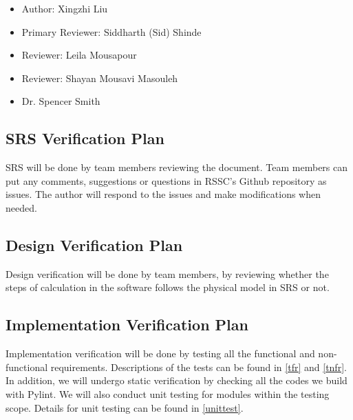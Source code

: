 \documentclass[12pt, titlepage]{article}
\begin{document}
\begin{itemize}
	\item Author: Xingzhi Liu
\end{itemize}

\begin{itemize}
	\item Primary Reviewer: Siddharth (Sid) Shinde
\end{itemize}

\begin{itemize}
	\item Reviewer: Leila Mousapour
\end{itemize}

\begin{itemize}
	\item Reviewer: Shayan Mousavi Masouleh
\end{itemize}

\begin{itemize}
	\item Dr. Spencer Smith
\end{itemize}

\subsection{SRS Verification Plan}

SRS will be done by team members reviewing the document. Team members can put
any comments, suggestions or questions in RSSC's Github repository as issues.
The author will respond to the issues and make modifications when needed.

\subsection{Design Verification Plan}

Design verification will be done by team members, by reviewing whether the steps 
of calculation in the software follows the physical model in SRS or not. 

\subsection{Implementation Verification Plan}

Implementation verification will be done by testing all the functional and non-
functional requirements. Descriptions of the tests can be found in \autoref{tfr} and \autoref{tnfr}. In addition, we will undergo static verification by checking
all the codes we build with Pylint. We will also conduct unit testing for modules
within the testing scope. Details for unit testing can be found in \autoref{unittest}.
\end{document}
